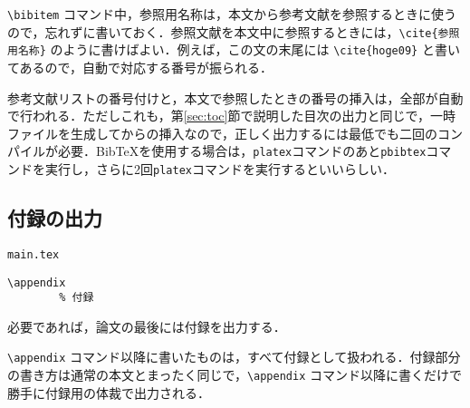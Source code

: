 \verb|\bibitem| コマンド中，参照用名称は，本文から参考文献を参照するときに使うので，忘れずに書いておく．参照文献を本文中に参照するときには，\verb|\cite{参照用名称}| のように書けばよい．例えば，この文の末尾には \verb|\cite{hoge09}| と書いてあるので，自動で対応する番号が振られる\cite{hoge09}\cite{hoge08}．

参考文献リストの番号付けと，本文で参照したときの番号の挿入は，全部が自動で行われる．ただしこれも，第\ref{sec:toc}節で説明した目次の出力と同じで，一時ファイルを生成してからの挿入なので，正しく出力するには最低でも二回のコンパイルが必要．BibTeXを使用する場合は，\verb|platex|コマンドのあと\verb|pbibtex|コマンドを実行し，さらに2回\verb|platex|コマンドを実行するといいらしい．



\subsection{付録の出力}

\begin{itembox}[l]{\texttt{main.tex}}
\begin{verbatim}
\appendix
		% 付録
\end{verbatim}
\end{itembox}

必要であれば，論文の最後には付録を出力する．

\verb|\appendix| コマンド以降に書いたものは，すべて付録として扱われる．付録部分の書き方は通常の本文とまったく同じで，\verb|\appendix| コマンド以降に書くだけで勝手に付録用の体裁で出力される．
